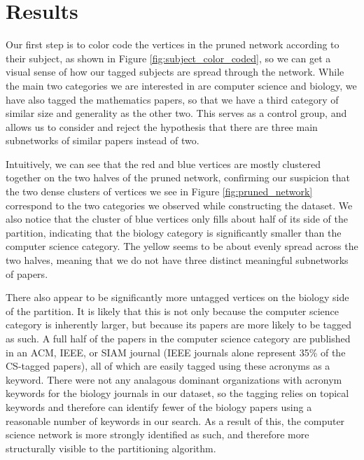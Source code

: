 \documentclass[12pt]{thesis}
\theoremstyle{plain}
\theoremstyle{definition}
\theoremstyle{remark}
\begin{document}
\section{Results}








Our first step is to color code the vertices in the pruned network according to their subject, as shown in Figure \ref{fig:subject_color_coded}, so we can get a visual sense of how our tagged subjects are spread through the network. While the main two categories we are interested in are computer science and biology, we have also tagged the mathematics papers, so that we have a third category of similar size and generality as the other two. This serves as a control group, and allows us to consider and reject the hypothesis that there are three main subnetworks of similar papers instead of two. 

Intuitively, we can see that the red and blue vertices are mostly clustered together on the two halves of the pruned network, confirming our suspicion that the two dense clusters of vertices we see in Figure \ref{fig:pruned_network} correspond to the two categories we observed while constructing the dataset. We also notice that the cluster of blue vertices only fills about half of its side of the partition, indicating that the biology category is significantly smaller than the computer science category. The yellow seems to be about evenly spread across the two halves, meaning that we do not have three distinct meaningful subnetworks of papers. 

There also appear to be significantly more untagged vertices on the biology side of the partition. It is likely that this is not only because the computer science category is inherently larger, but because its papers are more likely to be tagged as such. A full half of the papers in the computer science category are published in an ACM, IEEE, or SIAM journal (IEEE journals alone represent 35\% of the CS-tagged papers), all of which are easily tagged using these acronyms as a keyword. There were not any analagous dominant organizations with acronym keywords for the biology journals in our dataset, so the tagging relies on topical keywords and therefore can identify fewer of the biology papers using a reasonable number of keywords in our search. As a result of this, the computer science network is more strongly identified as such, and therefore more structurally visible to the partitioning algorithm.
\end{document}
